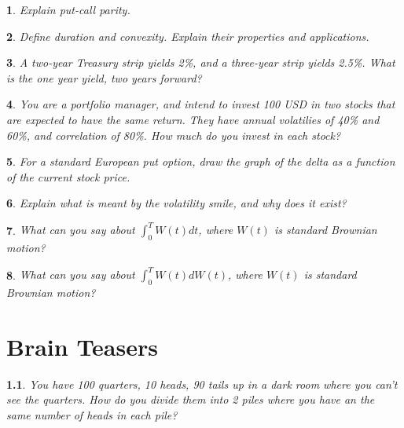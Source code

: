 \documentclass{report}
\newtheorem{problem}{}
\numberwithin{problem}{chapter} %
\begin{document}
\begin{problem}
Explain put-call parity.
\end{problem}

\begin{problem}
Define duration and convexity. Explain their properties and applications.
\end{problem}

\begin{problem}
A two-year Treasury strip yields 2\%, and a three-year strip yields 2.5\%. What is the one year yield, two years forward? 
\end{problem}

\begin{problem}
\cite{CRACK} You are a portfolio manager, and intend to invest 100 USD in two stocks that are expected to have the same return. They have annual volatilies of 40\% and 60\%, and correlation of 80\%.  How much do you invest in each stock?
\end{problem}

\begin{problem}
\cite{CRACK} For a standard European put option, draw the graph of the delta as a function of the current stock price.
\end{problem}

\begin{problem}
Explain what is meant by the volatility smile, and why does it exist?
\end{problem}

\begin{problem}
\cite{CRACK} What can you say about $\int_0^{T} W(t)dt$, where $W(t)$ is standard Brownian motion?
\end{problem}

\begin{problem}
\cite{CRACK} What can you say about $\int_0^{T} W(t)dW(t)$, where $W(t)$ is standard Brownian motion?
\end{problem}

\chapter{Brain Teasers}

\begin{problem}
You have 100 quarters, 10 heads, 90 tails up in a dark room where you can't see the quarters. How do you divide them into 2 piles where you have an the same number of heads in each pile?
\end{problem}
\end{document}
